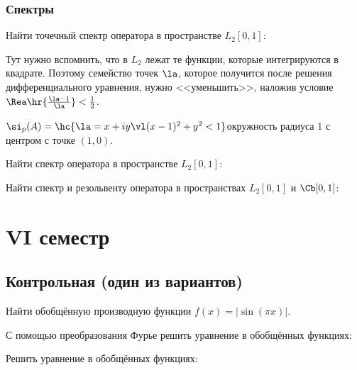 \documentclass[a4paper]{article}
\begin{document}
\subsubsection{Спектры}

\begin{problem}
Найти точечный спектр оператора в пространстве $L_2[0,1]$:
\end{problem}
\begin{hint}
Тут нужно вспомнить, что в $L_2$ лежат те функции, которые интегрируются в квадрате. Поэтому
семейство точек $\la$, которое получится после решения дифференциального уравнения, нужно
<<уменьшить>>, наложив условие $\Rea\hr{\frac{\la-1}{\la}} < \frac12$.
\end{hint}
\begin{answer}
$\si_p(A) = \hc{\la =x+iy \vl (x-1)^2+y^2 < 1}$\т окружность радиуса $1$ с центром с точке $(1,0)$.
\end{answer}

\begin{problem}
Найти спектр оператора в пространстве $L_2[0,1]$:
\end{problem}

\begin{problem}
Найти спектр и резольвенту оператора в пространствах $L_2[0,1]$ и $\Cb[0,1]$:
\end{problem}

\section{VI семестр}

\subsection{Контрольная (один из вариантов)}

\begin{problem}
Найти обобщённую производную функции $f(x) = |\sin (\pi x)|$.
\end{problem}

\begin{problem}
С помощью преобразования Фурье решить уравнение в обобщённых функциях:
\end{problem}

\begin{problem}
Решить уравнение в обобщённых функциях:
\end{problem}
\end{document}
